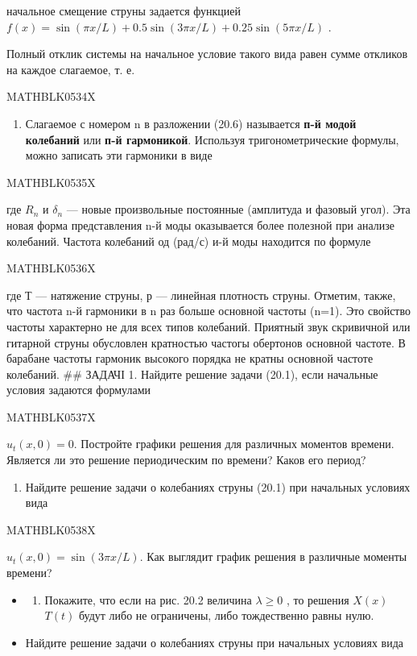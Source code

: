\documentclass[
  ukrainian,
]{article}
\providecommand{\tightlist}{%
  \setlength{\itemsep}{0pt}\setlength{\parskip}{0pt}}
\begin{document}
начальное смещение струны задается функцией
\(f(x) = \sin(\pi x/L) + 0.5 \sin(3\pi x/L) + 0.25 \sin(5\pi x/L)\) .

Полный отклик системы на начальное условие такого вида равен сумме
откликов на каждое слагаемое, т. е.

MATHBLK0534X

\begin{enumerate}
\def\labelenumi{\arabic{enumi}.}
\setcounter{enumi}{1}
\tightlist
\item
  Слагаемое с номером n в разложении (20.6) называется \textbf{п-й модой
  колебаний} или \textbf{п-й гармоникой}. Используя тригонометрические
  формулы, можно записать эти гармоники в виде
\end{enumerate}

MATHBLK0535X

где \(R_n\) и \(\delta_n\) --- новые произвольные постоянные (амплитуда
и фазовый угол). Эта новая форма представления n-й моды оказывается
более полезной при анализе колебаний. Частота колебаний од (рад/с) и-й
моды находится по формуле

MATHBLK0536X

где Т --- натяжение струны, р --- линейная плотность струны. Отметим,
также, что частота n-й гармоники в n раз больше основной частоты (n=1).
Это свойство частоты характерно не для всех типов колебаний. Приятный
звук скривичной или гитарной струны обусловлен кратностью частогы
обертонов основной частоте. В барабане частоты гармоник высокого порядка
не кратны основной частоте колебаний. \#\# ЗАДАЧІ 1. Найдите решение
задачи (20.1), если начальные условия задаются формулами

MATHBLK0537X

\(u_t(x, 0) = 0.\) Постройте графики решения для различных моментов
времени. Является ли это решение периодическим по времени? Каков его
период?

\begin{enumerate}
\def\labelenumi{\arabic{enumi}.}
\setcounter{enumi}{1}
\tightlist
\item
  Найдите решение задачи о колебаниях струны (20.1) при начальных
  условиях вида
\end{enumerate}

MATHBLK0538X

\(u_t(x, 0) = \sin(3\pi x/L).\) Как выглядит график решения в различные
моменты времени?

\begin{itemize}
\tightlist
\item
  \begin{enumerate}
  \def\labelenumi{\arabic{enumi}.}
  \setcounter{enumi}{2}
  \tightlist
  \item
    Покажите, что если на рис. 20.2 величина \(\lambda \geqslant 0\) ,
    то решения \(X(x)\) \(T(t)\) будут либо не ограничены, либо
    тождественно равны нулю.
  \end{enumerate}
\item
  Найдите решение задачи о колебаниях струны при начальных условиях вида
\end{itemize}
\end{document}
